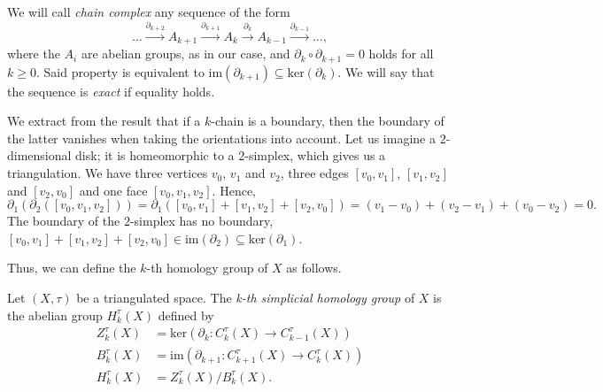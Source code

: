\begin{remark}
    We will call \textit{chain complex} any sequence of the form
        \begin{equation*}
            \dots \overset{\partial_{k+2}}{\longrightarrow} A_{k+1} \overset{\partial_{k+1}}{\longrightarrow} A_{k} \overset{\partial_{k}}{\longrightarrow} A_{k-1} \overset{\partial_{k-1}}{\longrightarrow} \dots,
        \end{equation*}
        where the $A_i$ are abelian groups, as in our case, and $\partial_{k}\circ\partial_{k+1}=0$ holds for all $k\ge 0$. Said property is equivalent to $\text{im}(\partial_{k+1})\subseteq\text{ker}(\partial_k)$. We will say that the sequence is \textit{exact} if equality holds.
\end{remark}

\bigskip

We extract from the result that if a $k$-chain is a boundary, then the boundary of the latter vanishes when taking the orientations into account. Let us imagine a $2$-dimensional disk; it is homeomorphic to a $2$-simplex, which gives us a triangulation. We have three vertices $v_0$, $v_1$ and $v_2$, three edges $[v_0,v_1]$, $[v_1,v_2]$ and $[v_2,v_0]$ and one face $[v_0, v_1, v_2]$. Hence,
\begin{equation*}
    \partial_1(\partial_2([v_0, v_1, v_2])) = \partial_1([v_0,v_1]+[v_1,v_2]+[v_2,v_0]) = (v_1-v_0) + (v_2-v_1) + (v_0-v_2) = 0.
\end{equation*}
The boundary of the $2$-simplex has no boundary, $[v_0,v_1]+[v_1,v_2]+[v_2,v_0]\in \text{im}(\partial_2) \subseteq \text{ker}(\partial_1)$.

Thus, we can define the $k$-th homology group of $X$ as follows.

\begin{definition}
    Let $(X,\tau)$ be a triangulated space. The \textit{k-th simplicial homology group} of $X$ is the abelian group $H^{\tau}_k(X)$ defined by
    \begin{align*}
        Z^{\tau}_k(X) &= \text{ker}(\partial_k: C^{\tau}_k(X) \to C^{\tau}_{k-1}(X)) \\
        B^{\tau}_k(X) &= \text{im}(\partial_{k+1}: C^{\tau}_{k+1}(X) \to C^{\tau}_{k}(X)) \\
        H^{\tau}_k(X) &= Z^{\tau}_k(X)/B^{\tau}_k(X).
    \end{align*}
\end{definition}

